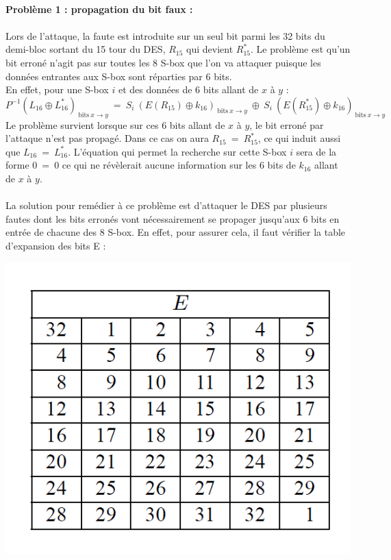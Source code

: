 			\paragraph{Problème 1 : propagation du bit faux :}
				\paragraph{} Lors de l'attaque, la faute est introduite sur un seul bit parmi les 32 bits du demi-bloc sortant du 15 tour du DES, $R_{15}$ qui devient $R_{15}^{*}$. Le problème est qu'un bit erroné n'agit pas sur toutes les 8 S-box que l'on va attaquer puisque les données entrantes aux S-box sont réparties par 6 bits.\\
				En effet, pour une S-box $i$ et des données de 6 bits allant de $x$ à $y$ :
				\[
				P^{-1}(L_{16} \oplus L_{16}^{*})_{\ \textrm{bits}\ x \to y}\ = \ S_{i}\ (E(R_{15}) \oplus k_{16})_{\ \textrm{bits}\ x \to y}\ \oplus \ S_{i}\ (E(R_{15}^{*}) \oplus k_{16})_{\ \textrm{bits}\ x \to y}
				\]
				Le problème survient lorsque sur ces 6 bits allant de $x$ à $y$, le bit erroné par l'attaque n'est pas propagé. Dans ce cas on aura $R_{15}\ =\ R_{15}^{*}$, ce qui induit aussi que $L_{16}\ =\ L_{16}^{*}$. L'équation qui permet la recherche sur cette S-box $i$ sera de la forme $0\ =\ 0$ ce qui ne révèlerait aucune information sur les 6 bits de $k_{16}$ allant de $x$ à $y$.
				
				\paragraph{} La solution pour remédier à ce problème est d'attaquer le DES par plusieurs fautes dont les bits erronés vont nécessairement se propager jusqu'aux 6 bits en entrée de chacune des 8 S-box. En effet, pour assurer cela, il faut vérifier la table d'expansion des bits E :

				\begin{center}\includegraphics[scale=0.5]{E.png}\end{center}
				
